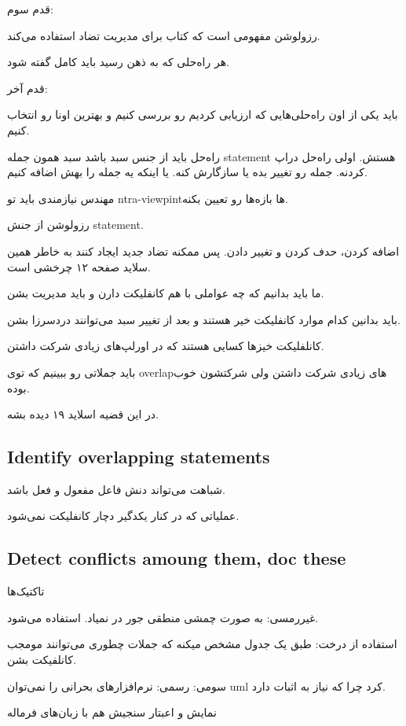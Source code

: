 قدم سوم:

رزولوشن مفهومی است که کتاب برای مدیریت تضاد استفاده می‌کند.

هر راه‌حلی که به ذهن رسید باید کامل گفته شود.

قدم آخر:

باید یکی از اون راه‌حلی‌هایی که ارزیابی کردیم رو بررسی کنیم و بهترین اونا رو
انتخاب کنیم.

راه‌حل باید از جنس سبد باشد سبد همون جمله statement هستش. اولی راه‌حل دراپ
کردنه. جمله رو تغییر بده یا سازگارش کنه. یا اینکه یه جمله را بهش اضافه کنیم.


مهندس نیازمندی باید تو ntra-viewpintها بازه‌ها رو تعیین بکنه.

رزولوشن از جنش statement.

اضافه کردن، حدف کردن و تغییر دادن. پس ممکنه تضاد جدید ایجاد کنند به خاطر همین
سلاید صفحه ۱۲ چرخشی است.

ما باید بدانیم که چه عواملی با هم کانفلیکت دارن و باید مدیریت بشن.

باید بدانین کدام موارد کانفلیکت خیر هستند و بعد از تغییر سبد می‌توانند دردسرزا
بشن.

کانلفلیکت خیزها کسایی هستند که در اورلپ‌های زیادی شرکت داشتن.

باید جملاتی رو ببینیم که توی overlapهای زیادی شرکت داشتن ولی شرکتشون خوب بوده.

در این قضیه اسلاید ۱۹ دیده بشه.

\subsection{Identify overlapping statements}

شباهت می‌تواند دنش فاعل مفعول و فعل باشد.

عملیاتی که در کنار یکدگیر دچار کانفلیکت نمی‌شود.

\subsection{Detect conflicts amoung them, doc these}

تاکتیک‌ها

غیررمسی: به صورت چمشی منطقی جور در نمیاد. استفاده می‌شود. 

استفاده از درخت: طبق یک جدول مشخص میکنه که جملات چطوری می‌توانند مومجب کانلفیکت
بشن.

سومی: رسمی: نرم‌افزار‌های بحرانی را نمی‌توان uml کرد چرا که نیاز به اثبات دارد.

نمایش و اعبتار سنجیش هم با زبان‌های فرماله

